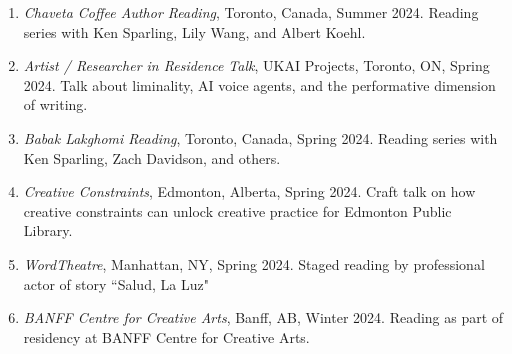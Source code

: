 \begin{enumerate}
    	\item \emph{Chaveta Coffee Author Reading}, Toronto, Canada, Summer 2024. \subitem Reading series with Ken Sparling, Lily Wang, and Albert Koehl. \\
	
	    \item \emph{Artist / Researcher in Residence Talk}, UKAI Projects, Toronto, ON, Spring 2024. \subitem Talk about liminality, AI voice agents, and the performative dimension of writing. 
	
    	\item \emph{Babak Lakghomi Reading}, Toronto, Canada, Spring 2024. \subitem Reading series with Ken Sparling, Zach Davidson, and others.  \\
        \item \emph{Creative Constraints}, Edmonton, Alberta, Spring 2024. \subitem Craft talk on how creative constraints can unlock creative practice for Edmonton Public Library.   \\
    \item \emph{WordTheatre}, Manhattan, NY, Spring 2024. \subitem Staged reading by professional actor of story ``Salud, La Luz" \\
      \item \emph{BANFF Centre for Creative Arts}, Banff, AB, Winter 2024. \subitem Reading as part of residency at BANFF Centre for Creative Arts. \\
    

\end{enumerate}
